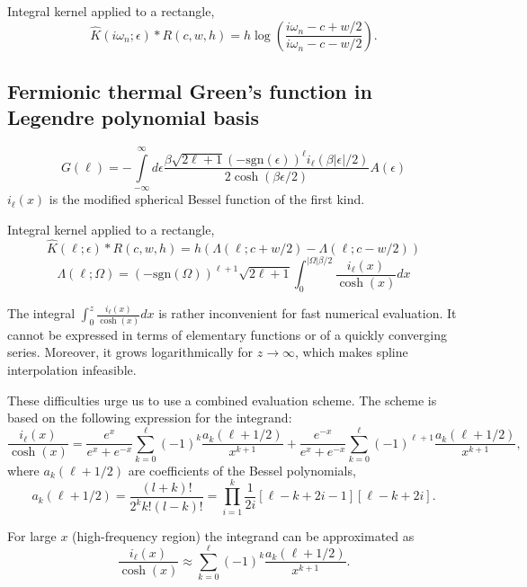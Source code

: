 \documentclass[]{article}
\begin{document}
Integral kernel applied to a rectangle,
\begin{equation}
	\hat K(i\omega_n;\epsilon)*R(c,w,h) =
	h \log\left(\frac{i\omega_n - c + w/2}{i\omega_n - c - w/2}\right).
\end{equation}

\subsection{Fermionic thermal Green's function in Legendre polynomial basis}
\label{fermiongf_legendre}
\begin{equation}
	G(\ell) = -\int\limits_{-\infty}^\infty
	d\epsilon \frac{\beta\sqrt{2\ell+1}(-\mathrm{sgn}(\epsilon))^\ell i_{\ell}(\beta|\epsilon|/2)}
	{2\cosh(\beta\epsilon/2)} A(\epsilon)
\end{equation}
$i_\ell(x)$ is the modified spherical Bessel function of the first kind.

Integral kernel applied to a rectangle,
\begin{equation}
	\hat K(\ell;\epsilon)*R(c,w,h) = h (\Lambda(\ell;c+w/2) - \Lambda(\ell;c-w/2))
\end{equation}
\begin{equation}
	\Lambda(\ell;\Omega) = (-\mathrm{sgn}(\Omega))^{\ell+1}\sqrt{2\ell+1}
	\int_0^{|\Omega|\beta/2} \frac{i_\ell(x)}{\cosh(x)} dx
\end{equation}

The integral $\int_0^z \frac{i_\ell(x)}{\cosh(x)} dx$ is rather inconvenient for fast numerical evaluation. It cannot be expressed in terms of elementary functions or of a quickly converging series. Moreover, it grows logarithmically for $z\to\infty$, which makes spline interpolation infeasible.

These difficulties urge us to use a combined evaluation scheme. The scheme is based on the following expression for the integrand:
\begin{equation}\label{il_cosh_series}
	\frac{i_\ell(x)}{\cosh(x)} =
	\frac{e^x}{e^x+e^{-x}}\sum_{k=0}^\ell(-1)^k
		\frac{a_k(\ell+1/2)}{x^{k+1}} +
	\frac{e^{-x}}{e^x+e^{-x}}\sum_{k=0}^\ell(-1)^{\ell+1}
		\frac{a_k(\ell+1/2)}{x^{k+1}},
\end{equation}
where $a_k(\ell+1/2)$ are coefficients of the Bessel polynomials,
\begin{equation}
	a_k(\ell+1/2) = \frac{(l+k)!}{2^k k!(l-k)!} =
	\prod_{i=1}^k \frac{1}{2i}[\ell-k+2i-1][\ell-k+2i].
\end{equation}

For large $x$ (high-frequency region) the integrand can be approximated as
\begin{equation}\label{il_cosh_series_high}
	\frac{i_\ell(x)}{\cosh(x)} \approx
		\sum_{k=0}^\ell(-1)^k \frac{a_k(\ell+1/2)}{x^{k+1}}.
\end{equation}
\end{document}
